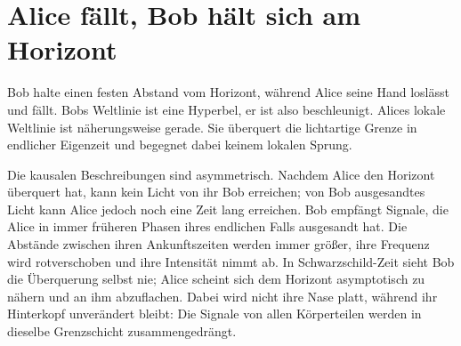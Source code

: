\section{Alice fällt, Bob hält sich am Horizont}

Bob halte einen festen Abstand vom Horizont, während Alice seine Hand loslässt und fällt. Bobs Weltlinie ist eine Hyperbel, er ist also beschleunigt. Alices lokale Weltlinie ist näherungsweise gerade. Sie überquert die lichtartige Grenze in endlicher Eigenzeit und begegnet dabei keinem lokalen Sprung.

Die kausalen Beschreibungen sind asymmetrisch. Nachdem Alice den Horizont überquert hat, kann kein Licht von ihr Bob erreichen; von Bob ausgesandtes Licht kann Alice jedoch noch eine Zeit lang erreichen. Bob empfängt Signale, die Alice in immer früheren Phasen ihres endlichen Falls ausgesandt hat. Die Abstände zwischen ihren Ankunftszeiten werden immer größer, ihre Frequenz wird rotverschoben und ihre Intensität nimmt ab. In Schwarzschild-Zeit sieht Bob die Überquerung selbst nie; Alice scheint sich dem Horizont asymptotisch zu nähern und an ihm abzuflachen. Dabei wird nicht ihre Nase platt, während ihr Hinterkopf unverändert bleibt: Die Signale von allen Körperteilen werden in dieselbe Grenzschicht zusammengedrängt.

\begin{classroomqa}
\end{classroomqa}

\begin{classroomqa}
\end{classroomqa}

